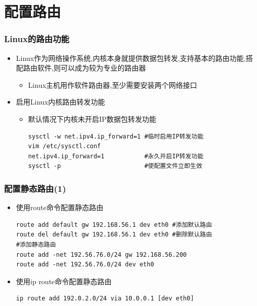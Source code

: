 \documentclass[xcolor=svgnames,presentation]{beamer}
\begin{document}
\section{配置路由}
\label{sec-3}
\begin{frame}[fragile]
\frametitle{Linux的路由功能}
\label{sec-3-1}
\begin{itemize}

\item Linux作为网络操作系统,内核本身就提供数据包转发,支持基本的路由功能,搭配路由软件,则可以成为较为专业的路由器
\label{sec-3-1-1}%
\begin{itemize}

\item Linux主机用作软件路由器,至少需要安装两个网络接口
\label{sec-3-1-1-1}%
\end{itemize} %

\item 启用Linux内核路由转发功能
\label{sec-3-1-2}%
\begin{itemize}

\item 默认情况下内核未开启IP数据包转发功能\\
\label{sec-3-1-2-1}%
\begin{verbatim}
sysctl -w net.ipv4.ip_forward=1 #临时启用IP转发功能
vim /etc/sysctl.conf
net.ipv4.ip_forward=1           #永久开启IP转发功能
sysctl -p                       #使配置文件立即生效
\end{verbatim}
\end{itemize} %
\end{itemize} %
\end{frame}
\begin{frame}[fragile]
\frametitle{配置静态路由(1)}
\label{sec-3-2}
\begin{itemize}

\item 使用route命令配置静态路由\\
\label{sec-3-2-1}%
\begin{verbatim}
route add default gw 192.168.56.1 dev eth0 #添加默认路由
route del default gw 192.168.56.1 dev eth0 #删除默认路由
#添加静态路由
route add -net 192.56.76.0/24 gw 192.168.56.200
route add -net 192.56.76.0/24 dev eth0
\end{verbatim}

\item 使用ip route命令配置静态路由\\
\label{sec-3-2-2}%
\begin{verbatim}
ip route add 192.0.2.0/24 via 10.0.0.1 [dev eth0]
\end{verbatim}
\end{itemize} %
\end{frame}
\end{document}
